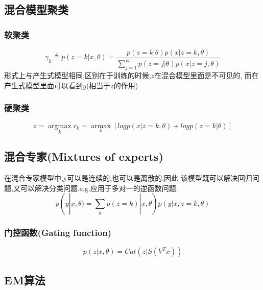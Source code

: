 \subsection{混合模型聚类}
\subsubsection{软聚类}
\begin{equation}
\gamma_{k} \triangleq p(z = k|x, \theta) = 
\frac{p(z = k|\theta)p(x|z=k, \theta)}
{\sum_{j=1}^Kp(z=j|\theta)p(x|z=j, \theta)}
\label{gamma}
\end{equation}
形式上与产生式模型相同,区别在于训练的时候,$z$在混合模型里面是不可见的,
而在产生式模型里面可以看到$y$(相当于$z$的作用)
\subsubsection{硬聚类}
\begin{equation}
z = \underset{k}{\operatorname{argmax}}r_k = 
\underset{k} {\operatorname{armax}}[logp(x|z = k,\theta) + logp(z=k|\theta)]
\end{equation}

\subsection{混合专家(Mixtures of experts)}
在混合专家模型中,y可以是连续的,也可以是离散的,因此
该模型既可以解决回归问题,又可以解决分类问题.e.g.应用于多对一的逆函数问题.
\begin{equation}
p(y|x, \theta) = \sum_kp(z = k)|x, \theta)p(y|x, z = k, \theta)
\end{equation}
\subsubsection{门控函数(Gating function)}
\begin{equation}
p(z|x, \theta) = Cat(z|S(V^Tx))
\end{equation}

\subsection{EM算法}
